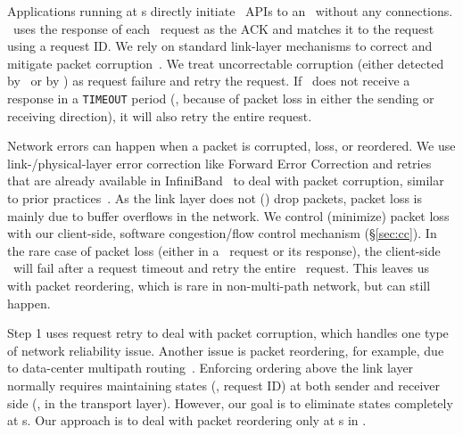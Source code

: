 Applications running at \CN{}s directly initiate \sys\ APIs to an \MN\ without any connections.
\syslib\ uses the response of each \sys\ request as the ACK and matches it to the request using a request ID.
We rely on standard link-layer mechanisms to correct and mitigate packet corruption~\cite{FEC}.
We treat uncorrectable corruption (either detected by \CN\ or by \MN) as request failure and retry the request.
If \syslib\ does not receive a response in a \texttt{TIMEOUT} period (\eg, because of packet loss in either the sending or receiving direction), %
it will also retry the entire request.

Network errors can happen when a packet is corrupted, loss, or reordered.
We use link-/physical-layer error correction like Forward Error Correction and retries that are already available in InfiniBand~\cite{MellanoxOFED} 
to deal with packet corruption, similar to prior practices~\cite{RAIL-NSDI17,FaSST}.
As the link layer does not () drop packets, packet loss is mainly due to buffer overflows in the network.
We control (minimize) packet loss with our client-side, software congestion/flow control mechanism (\S\ref{sec:cc}).
In the rare case of packet loss (either in a \sys\ request or its response), the client-side \syslib\ will fail after a request timeout
and retry the entire \sys\ request.
This leaves us with packet reordering, which is rare in non-multi-path network, but can still happen.
\fi

Step 1 uses request retry to deal with packet corruption, which handles one type of network reliability issue.
Another issue is packet reordering, for example, due to data-center multipath routing~\cite{ECMP}. %
Enforcing ordering above the link layer normally requires maintaining states (\eg, request ID) at both sender and receiver side (\eg, in the transport layer).
However, our goal is to eliminate states completely at \MN{}s.
Our approach is to deal with packet reordering only at \CN{}s in \syslib.

